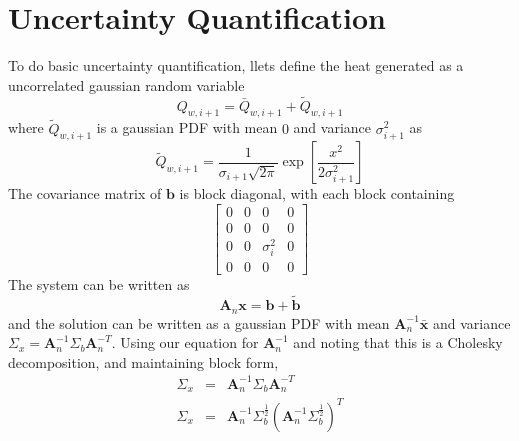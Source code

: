 \documentclass[11pt]{article}
\begin{document}
\section{Uncertainty Quantification}
To do basic uncertainty quantification, llets define the heat generated as a uncorrelated gaussian random variable
\begin{equation}
Q_{w,i+1} = \bar{Q}_{w,i+1}+\tilde{Q}_{w,i+1}
\end{equation}
where $\tilde{Q}_{w,i+1}$ is a gaussian PDF with mean $0$ and variance $\sigma_{i+1}^2$ as
\begin{equation}
\tilde{Q}_{w,i+1} = \frac{1}{\sigma_{i+1} \sqrt{2\pi}}\exp\left[\frac{x^2}{2\sigma_{i+1}^2}\right]
\end{equation}
The covariance matrix of $\mathbf{b}$ is block diagonal, with each block containing
\begin{equation}
\left[ \begin{array}{cccc} 0 & 0 & 0 & 0 \\ 0 & 0 & 0 & 0 \\ 0 & 0 & \sigma_i^2 & 0\\ 0 & 0 & 0 & 0 \end{array} \right] \end{equation}
The system can be written as 
\begin{equation}
\mathbf{A}_n\mathbf{x} = \mathbf{b}+\tilde{\mathbf{b}}
\end{equation}
and the solution can be written as a gaussian PDF with mean $\mathbf{A}_n^{-1}\bar{\mathbf{x}}$ and variance $\Sigma_x = \mathbf{A}_n^{-1}\Sigma_b \mathbf{A}_n^{-T}$. Using our equation for $\mathbf{A}_n^{-1}$ and noting that this is a Cholesky decomposition, and maintaining block form,
\begin{eqnarray}
\Sigma_x & = & \mathbf{A}_n^{-1}\Sigma_b \mathbf{A}_n^{-T} \\
\Sigma_x & = & \mathbf{A}_n^{-1}\Sigma_b^{\frac{1}{2}}(\mathbf{A}_n^{-1}\Sigma_b^{\frac{1}{2}})^T\\
\end{eqnarray}
\end{document}
